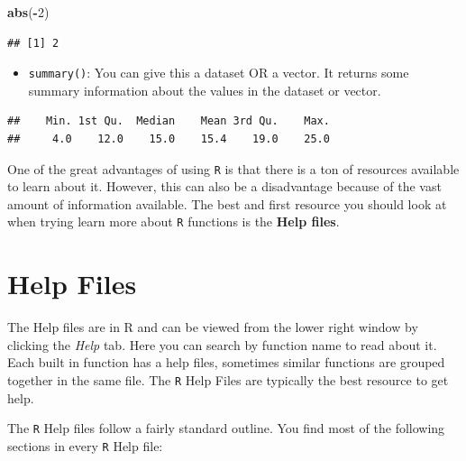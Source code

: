 \documentclass[
]{book}
\newenvironment{Shaded}{\begin{snugshade}}{\end{snugshade}}
\newcommand{\DecValTok}[1]{\textcolor[rgb]{0.00,0.00,0.81}{#1}}
\newcommand{\KeywordTok}[1]{\textcolor[rgb]{0.13,0.29,0.53}{\textbf{#1}}}
\newcommand{\NormalTok}[1]{#1}
\newcommand{\OperatorTok}[1]{\textcolor[rgb]{0.81,0.36,0.00}{\textbf{#1}}}
\providecommand{\tightlist}{%
  \setlength{\itemsep}{0pt}\setlength{\parskip}{0pt}}
\begin{document}
\begin{Shaded}
\begin{Highlighting}[]
\KeywordTok{abs}\NormalTok{(}\OperatorTok{-}\DecValTok{2}\NormalTok{)}
\end{Highlighting}
\end{Shaded}

\begin{verbatim}
## [1] 2
\end{verbatim}

\begin{itemize}
\tightlist
\item
  \texttt{summary()}: You can give this a dataset OR a vector. It returns some summary information about the values in the dataset or vector.
\end{itemize}

\begin{Shaded}
\end{Shaded}

\begin{verbatim}
##    Min. 1st Qu.  Median    Mean 3rd Qu.    Max. 
##     4.0    12.0    15.0    15.4    19.0    25.0
\end{verbatim}

One of the great advantages of using \texttt{R} is that there is a ton of resources available to learn about it. However, this can also be a disadvantage because of the vast amount of information available. The best and first resource you should look at when trying learn more about \texttt{R} functions is the \textbf{Help files}.

\hypertarget{help-files}{%
\section{Help Files}\label{help-files}}

The Help files are in R and can be viewed from the lower right window by clicking the \emph{Help} tab. Here you can search by function name to read about it. Each built in function has a help files, sometimes similar functions are grouped together in the same file. The \texttt{R} Help Files are typically the best resource to get help.

The \texttt{R} Help files follow a fairly standard outline. You find most of the following sections in every \texttt{R} Help file:
\end{document}
